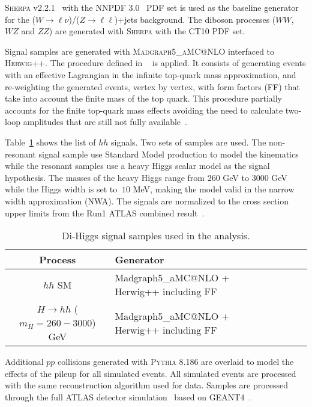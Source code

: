 \textsc{Sherpa} v2.2.1~\cite{Gleisberg:2008ta} with the \textsc{NNPDF 3.0}~\cite{Lai:2010vv} PDF set is used as the baseline generator for the ($W \to \ell\nu$)/($Z\to \ell\ell$)+jets background. The diboson processes ($WW$, $WZ$ and $ZZ$) are generated with \textsc{Sherpa} with the \textsc{CT10} PDF set.  

Signal samples are generated with \textsc{Madgraph5\_aMC@NLO} interfaced to \textsc{Herwig++}. The procedure defined in ~\cite{CP3Paper} is applied. It consists of generating events with an effective Lagrangian in the infinite top-quark mass approximation, and  re-weighting the generated events, vertex by vertex,  with form factors (FF) that take into account the finite mass of the top quark.  This procedure partially accounts for the finite top-quark mass effects avoiding the need to calculate two-loop amplitudes that are still not fully available~\cite{Degrassi_Ramona}. 

Table~\ref{tabular:mc_samples_hh} shows the list of $hh$ signals. Two sets of samples are used. The non-resonant signal sample use Standard Model production to model the kinematics while the resonant samples use a heavy Higgs scalar model as the signal hypothesis. The masses of the heavy Higgs range from 260 GeV to 3000 GeV while the Higgs width is set to $~10$ MeV, making the model valid in the narrow width approximation (NWA). The signals are normalized to the cross section upper limits from the Run1 ATLAS combined result~\cite{Aad:2015xja}. 
\begin{table}[!h]
\label{tabular:mc_samples_hh}
\begin{center}
\begin{tabular}{|c|l|c|c|c|c|r|}
	\hline
 Process                                    & Generator    \\ \hline
$hh$ SM & Madgraph5\_aMC@NLO + Herwig++ including FF \\
$H \to hh$ ($m_H =260 - 3000$) GeV & Madgraph5\_aMC@NLO +
                                     Herwig++ including FF \\
\hline
\end{tabular}
\end{center}
\caption{Di-Higgs signal samples used in the analysis. }
\end{table}
Additional $pp$ collisions generated with \textsc{Pythia} 8.186 are overlaid to model the effects of the pileup for all simulated events. All simulated events are processed with the same reconstruction algorithm used for data. Samples are processed through the full ATLAS detector simulation~\cite{Aad:2010ah} based on \textsc{GEANT4}~\cite{Agostinelli:2002hh}.

